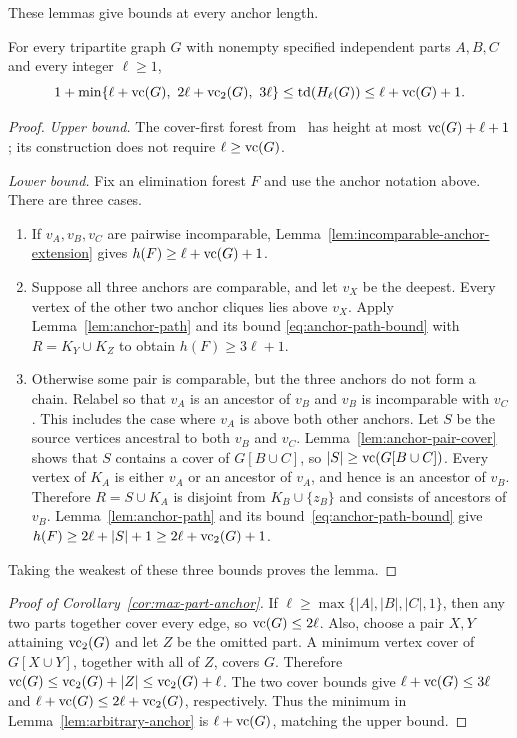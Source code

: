 These lemmas give bounds at every anchor length.

\begin{lemma}
\label{lem:arbitrary-anchor}
For every tripartite graph $G$ with nonempty specified independent
parts $A,B,C$ and every integer $\ell\ge1$,
\[
 1+\min\{\ell+\vc(G),\ 2\ell+\vc_2(G),\ 3\ell\}
 \le\td(H_\ell(G))\le\ell+\vc(G)+1.
\]
\end{lemma}

\begin{proof}
\emph{Upper bound.}
The cover-first forest from~\cite[proof of Lemma~6]{BNS} has height
at most $\operatorname{vc}(G)+\ell+1$; its construction does not require
$\ell\ge\operatorname{vc}(G)$.

\emph{Lower bound.}
Fix an elimination forest $F$ and use the anchor notation above.
There are three cases.
\begin{enumerate}
 \item If $v_A,v_B,v_C$ are pairwise incomparable,
   Lemma~\ref{lem:incomparable-anchor-extension} gives
   $h(F)\ge\ell+\operatorname{vc}(G)+1$.

 \item Suppose all three anchors are comparable, and let $v_X$
   be the deepest. Every vertex of the other two anchor cliques lies
   above $v_X$. Apply Lemma~\ref{lem:anchor-path} and its bound
   \eqref{eq:anchor-path-bound} with $R=K_Y\cup K_Z$ to obtain
   $h(F)\ge3\ell+1$.

 \item Otherwise some pair is comparable, but the three anchors do
   not form a chain. Relabel so that $v_A$ is an ancestor of
   $v_B$ and $v_B$ is incomparable with $v_C$.
   This includes the case where $v_A$ is above both other
   anchors. Let $S$ be the source vertices ancestral
   to both $v_B$ and $v_C$. Lemma~\ref{lem:anchor-pair-cover} shows that
   $S$ contains a cover of $G[B\cup C]$, so
   $|S|\ge\operatorname{vc}(G[B\cup C])$. Every vertex
   of $K_A$ is either $v_A$ or an ancestor of $v_A$, and hence is an ancestor of $v_B$.
   Therefore $R=S\cup K_A$ is disjoint from $K_B\cup\{z_B\}$ and
   consists of ancestors of $v_B$. Lemma~\ref{lem:anchor-path} and
   its bound~\eqref{eq:anchor-path-bound} give
   $h(F)\ge2\ell+|S|+1\ge2\ell+\operatorname{vc}_2(G)+1$.
\end{enumerate}
Taking the weakest of these three bounds proves the lemma.
\end{proof}

\begin{proof}[Proof of Corollary~\ref{cor:max-part-anchor}]
If $\ell\ge\max\{|A|,|B|,|C|,1\}$, then any two parts together
cover every edge, so $\operatorname{vc}(G)\le2\ell$. Also, choose a pair $X,Y$
attaining $\operatorname{vc}_2(G)$ and let $Z$ be the omitted part. A minimum
vertex cover of $G[X\cup Y]$, together with all of $Z$, covers $G$.
Therefore $\operatorname{vc}(G)\le\operatorname{vc}_2(G)+|Z|\le\operatorname{vc}_2(G)+\ell$. The two
cover bounds give
$\ell+\operatorname{vc}(G)\le3\ell$ and
$\ell+\operatorname{vc}(G)\le2\ell+\operatorname{vc}_2(G)$, respectively. Thus the minimum
in Lemma~\ref{lem:arbitrary-anchor} is $\ell+\operatorname{vc}(G)$, matching the
upper bound.
\end{proof}
